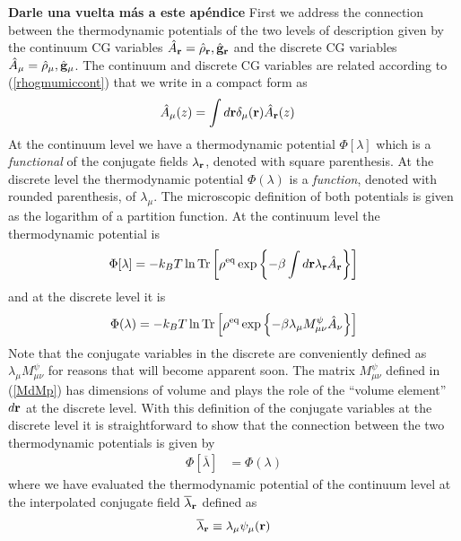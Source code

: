 \documentclass[b5paper,openright,11pt]{book}
\newcommand{\Note}[1]{{\bf \color{red}#1}}    %
\begin{document}
\begin{appendices}
\Note{Darle una vuelta más a este apéndice}
First we  address the connection between  the thermodynamic potentials
of the two  levels of description given by the  continuum CG variables
$\hat{A}_{\bf  r}=\hat{\rho}_{\bf  r},\hat{\bf  g}_{\bf  r}$  and  the
discrete  CG  variables $\hat{A}_\mu=\hat{\rho}_\mu,\hat{\bf  g}_\mu$.
The  continuum and  discrete  CG variables  are  related according  to
(\ref{rhogmumiccont}) that we write in a compact form as
\begin{align}
  \hat{A}_\mu(z)&=\int d{\bf r}\delta_\mu({\bf r})\hat{A}_{\bf r}(z)
\end{align}
At   the   continuum  level   we   have   a  thermodynamic   potential
$\Phi[\lambda]$ which is a \textit{functional} of the conjugate fields
$\lambda_{\bf r}$,  denoted with square parenthesis.   At the discrete
level    the   thermodynamic    potential    $\Phi(\lambda)$   is    a
\textit{function}, denoted with rounded parenthesis, of $\lambda_\mu$.
The  microscopic  definition  of  both  potentials  is  given  as  the
logarithm  of  a  partition  function.  At  the  continuum  level  the
thermodynamic potential is
\begin{align}
  \Phi[\lambda]=-k_BT\ln{\rm Tr}\left[\rho^{\rm eq}\exp\left\{-\beta\int d{\bf r}\lambda_{\bf r}\hat{A}_{\bf r}\right\}\right]
 \end{align}
and at the discrete level it is 
  \begin{align}
  \Phi(\lambda)=-k_BT\ln{\rm Tr}\left[\rho^{\rm eq}\exp\left\{-\beta\lambda_{\mu}M^\psi_{\mu\nu}\hat{A}_{\nu}\right\}\right]
\end{align}
Note that  the conjugate  variables in  the discrete  are conveniently
defined as $\lambda_{\mu}M^\psi_{\mu\nu}$ for reasons that will become
apparent soon.   The matrix $M^\psi_{\mu\nu}$ defined  in (\ref{MdMp})
has dimensions of volume and plays  the role of the ``volume element''
$d{\bf  r}$  at the  discrete  level.   With  this definition  of  the
conjugate variables  at the  discrete level  it is  straightforward to
show that the  connection between the two  thermodynamic potentials is
given by
\begin{align}
  \Phi[\overline{\lambda}]&=  \Phi(\lambda)
\label{Phiphi}
\end{align}
where we have  evaluated the thermodynamic potential  of the continuum
level at the interpolated conjugate field $\overline{\lambda}_{\bf r}$
defined as
\begin{align}
  \overline{\lambda}_{\bf r}\equiv\lambda_\mu\psi_\mu({\bf r})
\end{align}

\end{appendices}
\end{document}
